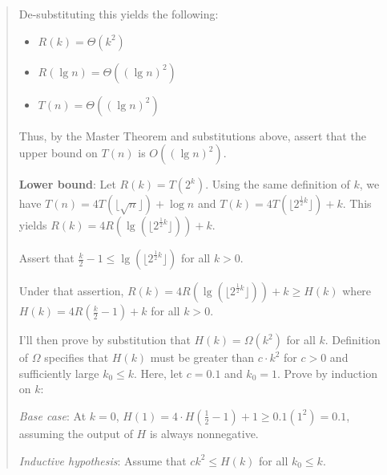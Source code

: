 \documentclass[11pt]{article}
\begin{document}
\begin{enumerate}[leftmargin=*]
\begin{enumerate}
\begin{enumerate}
\begin{quote}
          \medskip
          De-substituting this yields the following:
          \begin{itemize}
            \item $R(k) = \Theta(k^2)$ 
            \item $R(\lg n) = \Theta((\lg n)^2)$
            \item $T(n) = \Theta((\lg n)^2)$
          \end{itemize}

          Thus, by the Master Theorem and substitutions above, assert that the upper bound on $T(n)$ is $O((\lg n)^2)$. 

          \medskip
          \textbf{Lower bound}:
          Let $R(k) = T(2^k)$. Using the same definition of $k$, we have $T(n) = 4T(\lfloor \sqrt{n} \rfloor) + \log n$ and $T(k) = 4T(\lfloor 2^{\frac{1}{2}k} \rfloor) + k$. This yields $R(k) = 4R(\lg(\lfloor 2^{\frac{1}{2}k} \rfloor)) + k$.

          \medskip
          Assert that $\frac{k}{2} - 1 \leq \lg(\lfloor 2^{\frac{1}{2}k} \rfloor)$ for all $k > 0$. 

          \medskip
          Under that assertion, $R(k) = 4R(\lg(\lfloor 2^{\frac{1}{2}k} \rfloor)) + k \geq H(k)$ where $H(k) = 4R(\frac{k}{2} - 1) + k$ for all $k > 0$. 

        \medskip
      I'll then prove by substitution that $H(k) = \Omega(k^2)$ for all $k$. Definition of $\Omega$ specifies that $H(k)$ must be greater than $c \cdot k^2$ for $c > 0$ and sufficiently large $k_0 \leq k$. Here, let $c = 0.1$ and $k_0 = 1$. Prove by induction on $k$: 

        \medskip
        \textit{Base case}: At $k = 0$, $H(1) = 4 \cdot H(\frac{1}{2} - 1) + 1 \geq 0.1(1^2) = 0.1$, assuming the output of $H$ is always nonnegative.

        \medskip
        \textit{Inductive hypothesis}: Assume that $ck^2 \leq H(k)$ for all $k_0 \leq k$. 


\end{quote}
\end{enumerate}
\end{enumerate}
\end{enumerate}
\end{document}
